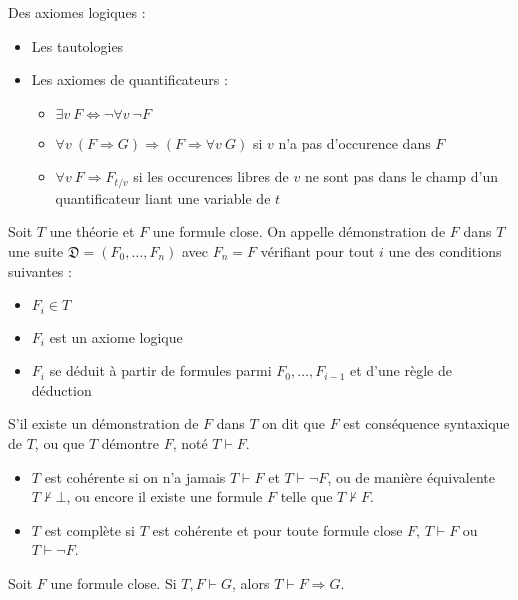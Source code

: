 \documentclass[a4paper]{article}
\begin{document}
Des axiomes logiques :

\begin{itemize}
\item Les tautologies
\item Les axiomes de quantificateurs :
  \begin{itemize}
  \item $\exists v\ F \Leftrightarrow \neg\forall v\ \neg F$
  \item $\forall v\ (F \Rightarrow G) \Rightarrow (F \Rightarrow \forall v\ G)$ si $v$ n'a pas d'occurence dans $F$
  \item $\forall v\ F \Rightarrow F_{t/v}$ si les occurences libres de $v$ ne sont pas dans le champ d'un quantificateur liant une variable de $t$
  \end{itemize}
\end{itemize}

\begin{definition}
  Soit $T$ une théorie et $F$ une formule close. On appelle démonstration de $F$ dans $T$ une suite $\mathfrak{D} = (F_0,\dots,F_n)$ avec $F_n = F$ vérifiant pour tout $i$ une des conditions suivantes :
  \begin{itemize}
  \item $F_i \in T$
  \item $F_i$ est un axiome logique
  \item $F_i$ se déduit à partir de formules parmi $F_0,\dots,F_{i-1}$ et d'une règle de déduction
  \end{itemize}
  S'il existe un démonstration de $F$ dans $T$ on dit que $F$ est conséquence syntaxique de $T$, ou que $T$ démontre $F$, noté $T \vdash F$.
\end{definition}

\begin{definition}\mbox{}
  \begin{itemize}
  \item $T$ est cohérente si on n'a jamais $T\vdash F$ et $T\vdash\neg F$, ou de manière équivalente $T\not\vdash\bot$, ou encore il existe une formule $F$ telle que $T\not\vdash F$.
  \item $T$ est complète si $T$ est cohérente et pour toute formule close $F$, $T\vdash F$ ou $T\vdash\neg F$.
  \end{itemize}
\end{definition}

\begin{theorem}
  Soit $F$ une formule close. Si $T,F\vdash G$, alors $T\vdash F\Rightarrow G$.
\end{theorem}
\end{document}
